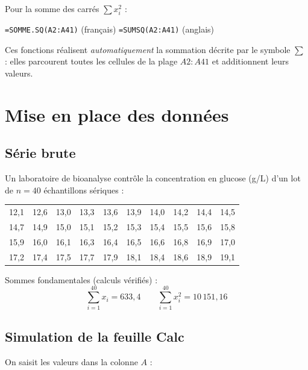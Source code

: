 \documentclass[11pt,a4paper]{article}
\newcommand{\fc}[1]{\textcolor{calcform}{\texttt{#1}}}
\begin{document}
\noindent Pour la somme des carrés \( \sum x_i^2 \) :
\begin{center}
\fc{=SOMME.SQ(A2:A41)} \quad (français) \qquad
\fc{=SUMSQ(A2:A41)} \quad (anglais)
\end{center}

\noindent Ces fonctions réalisent \emph{automatiquement} la
sommation décrite par le symbole \( \sum \) : elles parcourent
toutes les cellules de la plage \( A2:A41 \) et additionnent
leurs valeurs.

\section{Mise en place des données}

\subsection{Série brute}

Un laboratoire de bioanalyse contrôle la concentration en glucose
(\si{g/L}) d'un lot de \( n = 40 \) échantillons sériques :

\begin{center}
\footnotesize
\begin{tabular}{|l|l|l|l|l|l|l|l|l|l|}
\hline
\rowcolor{calchead}
12,1 & 12,6 & 13,0 & 13,3 & 13,6 & 13,9 & 14,0 & 14,2 & 14,4 & 14,5 \\
14,7 & 14,9 & 15,0 & 15,1 & 15,2 & 15,3 & 15,4 & 15,5 & 15,6 & 15,8 \\
15,9 & 16,0 & 16,1 & 16,3 & 16,4 & 16,5 & 16,6 & 16,8 & 16,9 & 17,0 \\
17,2 & 17,4 & 17,5 & 17,7 & 17,9 & 18,1 & 18,4 & 18,6 & 18,9 & 19,1 \\
\hline
\end{tabular}
\end{center}

\medskip
\noindent Sommes fondamentales (calculs vérifiés) :
\[
\sum_{i=1}^{40} x_i = 633{,}4
\qquad
\sum_{i=1}^{40} x_i^{2} = 10\,151{,}16
\]

\subsection{Simulation de la feuille Calc}

On saisit les valeurs dans la colonne \( A \) :
\end{document}
